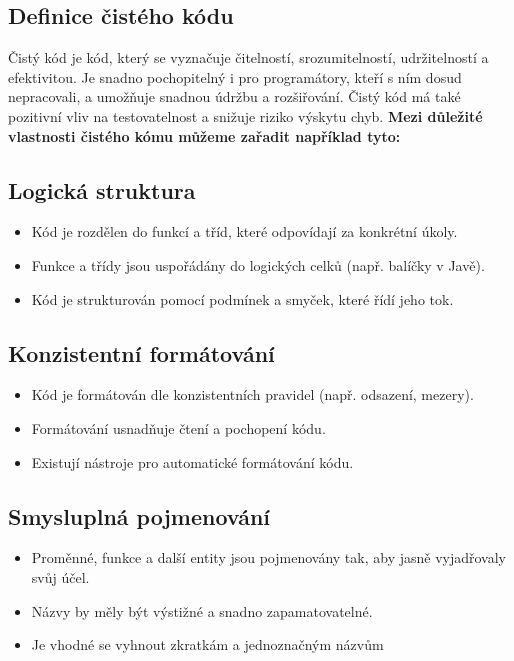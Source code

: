 \documentclass{article}
\begin{document}
    \begin{Čistý kód - Funkce}
        \section{Definice čistého kódu}\label{sec:definice-cisteho-kodu}
        Čistý kód je kód, který se vyznačuje čitelností, srozumitelností, udržitelností a efektivitou.
        Je snadno pochopitelný i pro programátory, kteří s ním dosud nepracovali, a umožňuje snadnou údržbu a rozšiřování.
        Čistý kód má také pozitivní vliv na testovatelnost a snižuje riziko výskytu chyb.
        \cite{CleanCodeBook}
        \textbf{Mezi důležité vlastnosti čistého kómu můžeme zařadit například tyto:}

        \subsection{Logická struktura}\label{subsec:logicka-struktura}
        \begin{itemize}
            \item Kód je rozdělen do funkcí a tříd, které odpovídají za konkrétní úkoly.
            \item Funkce a třídy jsou uspořádány do logických celků (např.
            balíčky v Javě).
            \item Kód je strukturován pomocí podmínek a smyček, které řídí jeho tok.
        \end{itemize}

        \subsection{Konzistentní formátování}\label{subsec:konzistentni-formatovani}
        \begin{itemize}
            \item Kód je formátován dle konzistentních pravidel (např.
            odsazení, mezery).
            \item Formátování usnadňuje čtení a pochopení kódu.
            \item Existují nástroje pro automatické formátování kódu.
        \end{itemize}

        \subsection{Smysluplná pojmenování}\label{subsec:smysluplna-pojmenovani}
        \begin{itemize}
            \item Proměnné, funkce a další entity jsou pojmenovány tak, aby jasně vyjadřovaly svůj účel.
            \item Názvy by měly být výstižné a snadno zapamatovatelné.
            \item Je vhodné se vyhnout zkratkám a jednoznačným názvům
        \end{itemize}


\end{Čistý kód - Funkce}
\end{document}
